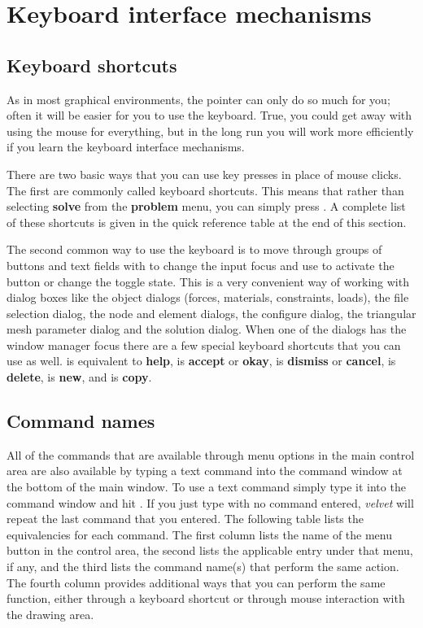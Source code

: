 \section{Keyboard interface mechanisms}
\label{velvet.keyboard}
\subsection{Keyboard shortcuts}

As in most graphical environments, the pointer can only do so much for you;
often it will be easier for you to use the keyboard.  True, you could get
away with using the mouse for everything, 
but in the long run you will work more efficiently if you learn the 
keyboard interface mechanisms. 

There are two basic ways that you can use key presses in place of mouse
clicks.  The first are commonly called keyboard shortcuts.  This means
that rather than selecting {\bf solve} from the {\bf problem} menu,
you can simply press .  A complete list of these shortcuts
is given in the quick reference table at the end of this section.

The second common way to use the keyboard is to move through groups of
buttons and text fields with  to change the input focus and use
 to activate the button or change the toggle state.  This is
a very convenient way of working with dialog boxes like the object
dialogs (forces, materials, constraints, loads), the file selection
dialog, the node and element dialogs, the configure dialog, the
triangular mesh parameter dialog and the solution dialog.  When one of
the dialogs has the window manager focus there are a few special keyboard
shortcuts that you can use as well.   is equivalent to {\bf
help},  is {\bf accept} or {\bf okay},  is {\bf
dismiss} or {\bf cancel},  is {\bf delete},  is
{\bf new}, and  is {\bf copy}.

\subsection{Command names}

All of the commands that are available through menu options in the main
control area are also available by typing a text command into the command
window at the bottom of the main window.  To use a text command simply
type it into the command window and hit .  If you just type
 with no command entered, {\em velvet} will repeat the 
last command that you entered.  The following table lists
the equivalencies for each command.  The first column lists the name of
the menu button in the control area, the second lists the applicable
entry under that menu, if any, and the third lists the command name(s)
that perform the same action.  The fourth column provides additional
ways that you can perform the same function, either through a keyboard 
shortcut or through mouse interaction with the drawing area.  

